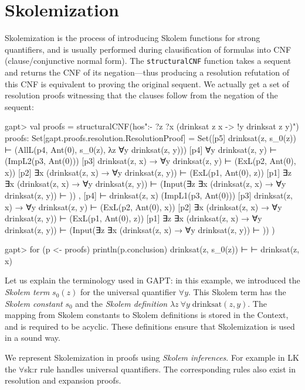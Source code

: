 \documentclass[a4paper,11pt]{book}
\begin{document}
\section{Skolemization}\label{secskolem}

Skolemization is the process of introducing Skolem functions for strong
quantifiers, and is usually performed during clausification of formulas into
CNF (clause/conjunctive normal form).  The \texttt{structuralCNF} function
takes a sequent and returns the CNF of its negation---thus producing a
resolution refutation of this CNF is equivalent to proving the original
sequent.  We actually get a set of resolution proofs witnessing that the
clauses follow from the negation of the sequent:
\begin{clilisting}
gapt> val proofs = structuralCNF(hos":- ?z ?x (drinksat z x -> !y drinksat z y)")
proofs: Set[gapt.proofs.resolution.ResolutionProof] =
Set([p5] drinksat(z, s_0(z)) ⊢    (AllL(p4, Ant(0), s_0(z), λz ∀y drinksat(z, y)))
[p4] ∀y drinksat(z, y) ⊢    (ImpL2(p3, Ant(0)))
[p3] drinksat(z, x) → ∀y drinksat(z, y) ⊢    (ExL(p2, Ant(0), x))
[p2] ∃x (drinksat(z, x) → ∀y drinksat(z, y)) ⊢    (ExL(p1, Ant(0), z))
[p1] ∃z ∃x (drinksat(z, x) → ∀y drinksat(z, y)) ⊢    (Input(∃z ∃x (drinksat(z, x) → ∀y drinksat(z, y)) ⊢ ))
, [p4]  ⊢ drinksat(z, x)   (ImpL1(p3, Ant(0)))
[p3] drinksat(z, x) → ∀y drinksat(z, y) ⊢    (ExL(p2, Ant(0), x))
[p2] ∃x (drinksat(z, x) → ∀y drinksat(z, y)) ⊢    (ExL(p1, Ant(0), z))
[p1] ∃z ∃x (drinksat(z, x) → ∀y drinksat(z, y)) ⊢    (Input(∃z ∃x (drinksat(z, x) → ∀y drinksat(z, y)) ⊢ ))
)

gapt> for (p <- proofs) println(p.conclusion)
drinksat(z, s_0(z)) ⊢ 
 ⊢ drinksat(z, x)

\end{clilisting}

Let us explain the terminology used in GAPT: in this example, we introduced
the \emph{Skolem term} $s_0(z)$ for the universal quantifier $\forall y$.  This
Skolem term has the \emph{Skolem constant} $s_0$ and the \emph{Skolem
definition} $\lambda z\: \forall y\; \mathrm{drinksat}(z,y)$.  The mapping from
Skolem constants to Skolem definitions is stored in the Context, and is
required to be acyclic.  These definitions ensure that Skolemization is used in
a sound way.

We represent Skolemization in proofs using \emph{Skolem inferences}.  For
example in LK the $\forall$sk:r rule handles universal quantifiers.  The
corresponding rules also exist in resolution and expansion proofs.
\begin{prooftree}
\end{prooftree}
\end{document}
